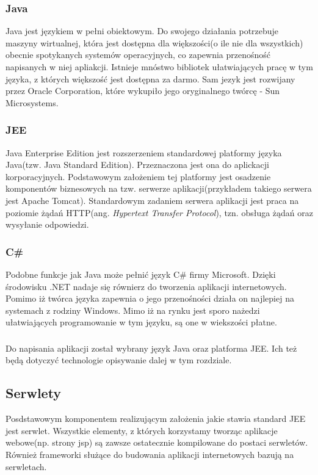 \subsubsection{Java}
Java jest językiem w pełni obiektowym. Do swojego działania potrzebuje maszyny wirtualnej, która jest dostępna dla większości(o ile nie dla wszystkich) obecnie spotykanych systemów operacyjnych, co zapewnia przenośność napisanych w niej apliakcji. Istnieje mnóstwo bibliotek ułatwiających pracę w tym języka, z których większość jest dostępna za darmo. Sam jezyk jest rozwijany przez Oracle Corporation, które wykupiło jego oryginalnego twórcę - Sun Microsystems.

\subsubsection{JEE}
Java Enterprise Edition jest rozszerzeniem standardowej platformy języka Java(tzw. Java Standard Edition). Przeznaczona jest ona do aplickacji korporacyjnych. Podstawowym założeniem tej platformy jest osadzenie komponentów biznesowych na tzw. serwerze aplikacji(przykładem takiego serwera jest Apache Tomcat). Standardowym zadaniem serwera aplikacji jest praca na poziomie żądań HTTP(ang. \textit{Hypertext Transfer Protocol}), tzn. obsługa żądań oraz wysyłanie odpowiedzi.

\subsubsection{C\#}
Podobne funkcje jak Java może pełnić język C\# firmy Microsoft. Dzięki środowisku .NET nadaje się równierz do tworzenia aplikacji internetowych. Pomimo iż twórca języka zapewnia o jego przenośności działa on najlepiej na systemach z rodziny Windows. Mimo iż na rynku jest sporo nażedzi ułatwiających programowanie w tym języku, są one w wiekszości płatne.

\subsubsection{}
Do napisania aplikacji został wybrany język Java oraz platforma JEE. Ich też będą dotyczyć technologie opisywanie dalej w tym rozdziale.

\subsection[Serwlety][Serwlety]{Serwlety}
Posdstawowym komponentem realizującym założenia jakie stawia standard JEE jest serwlet. Wszystkie elementy, z których korzystamy tworząc aplikacje webowe(np. strony jsp) są zawsze ostatecznie kompilowane do postaci serwletów. Również frameworki służące do budowania aplikacji internetowych bazują na serwletach.

